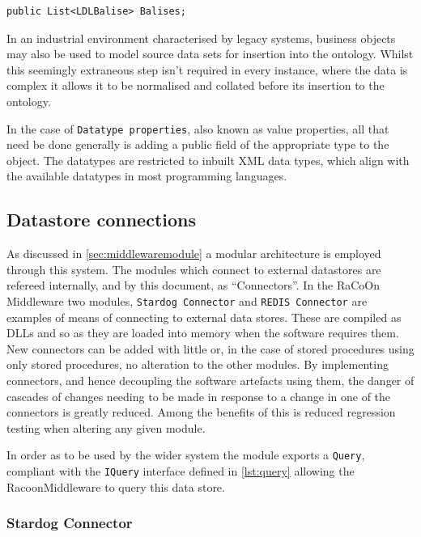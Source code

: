 \begin{lstlisting}[language={[Sharp]C},frame=tb,caption={Linking of Balises to BaliseGroups},label=lst:bgtob]
   public List<LDLBalise> Balises;
\end{lstlisting}

In an industrial environment characterised by legacy systems, business objects may also be used to model source data sets for insertion into the ontology. Whilst this seemingly extraneous step isn't required in every instance, where the data is complex it allows it to be normalised and collated before its insertion to the ontology.

In the case of \texttt{Datatype properties}, also known as value properties, all that need be done generally is adding a public field of the appropriate type to the object. The datatypes are restricted to inbuilt XML data types, which align with the available datatypes in most programming languages. 

\subsection{Datastore connections}
As discussed in \autoref{sec:middlewaremodule} a modular architecture is employed through this system. The modules which connect to external datastores are refereed internally, and by this document, as ``Connectors''. In the RaCoOn Middleware two modules, \texttt{Stardog Connector} and \texttt{REDIS Connector} are examples of means of connecting to external data stores. These are compiled as DLLs and so as they are loaded into memory when the software requires them. New connectors can be added with little or, in the case of stored procedures using only stored procedures, no alteration to the other modules. By implementing connectors, and hence decoupling the software artefacts using them, the danger of cascades of changes needing to be made in response to a change in one of the connectors is greatly reduced. Among the benefits of this is reduced regression testing when altering any given module. 

In order as to be used by the wider system the module exports a \texttt{Query}, compliant with the \texttt{IQuery} interface defined in \autoref{lst:query} allowing the RacoonMiddleware to query this data store.

\subsubsection{Stardog Connector}

